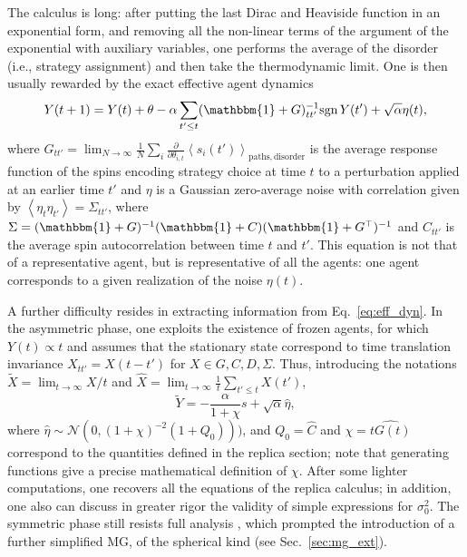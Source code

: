 \documentclass[aps,twocolumn,nofootinbib,sortedaddress,reprint]{revtex4-1}
\begin{document}
The calculus is long: after putting the last Dirac and Heaviside
function in an exponential form, and removing all the non-linear terms
of the argument of the exponential with auxiliary variables, one
performs the average of the disorder (i.e., strategy assignment) and
then take the thermodynamic limit. One is then usually rewarded by the
exact effective agent dynamics
\begin{equation}\label{eq:eff_dyn}
Y(t+1)=Y(t)+\theta-\alpha\sum_{t'\le
  t}(\mathbbm{1}+G)_{tt'}^{-1}\textrm{sgn}\,Y(t')+\sqrt{\alpha}\eta(t),
\end{equation}
where $G_{tt'}=\lim_{N\to\infty}\frac{1}{N}\sum_i\frac{\partial
}{\partial \theta_{i,t}}\left<s_i(t')\right>_\mathrm{paths, disorder}$
is the average response function of the spins encoding strategy choice
at time $t$ to a perturbation applied at an earlier time $t'$ and
$\eta$ is a Gaussian zero-average noise with correlation given by
$\left<\eta_t\eta_{t'}\right>=\Sigma_{tt'}$, where
$\Sigma=(\mathbbm{1}+G)^{-1}(\mathbbm{1}+C)(\mathbbm{1}+G^\top)^{-1}$ and
$C_{tt'}$ is the average spin autocorrelation between time $t$ and
$t'$.  This equation is not that of a representative agent, but is
representative of all the agents: one agent corresponds to a given
realization of the noise $\eta(t)$.

A further difficulty resides in extracting information from
Eq.\ \eqref{eq:eff_dyn}. In the asymmetric phase, one exploits the
existence of frozen agents, for which $Y(t)\propto t$ and assumes that
the stationary state correspond to time translation invariance
$X_{tt'}=X(t-t')$ for $X\in{G,C,D,\Sigma}$.  Thus, introducing the
notations $\tilde{X}=\lim_{t\to\infty}X/t$ and $\hat
X=\lim_{t\to\infty}\frac{1}{t}\sum_{t'\le t}X(t')$,
\begin{equation}
 \tilde Y=-\frac{\alpha}{1+\chi}s+\sqrt{\alpha}\hat{\eta},
\end{equation}
where $\hat{\eta}\sim\mathcal{N}(0,(1+\chi)^{-2}(1+Q_0)))$, and
$Q_0=\hat{ C}$ and $\chi=\hat{tG(t)}$ correspond to the quantities
defined in the replica section; note that generating functions give a
precise mathematical definition of $\chi$. After some
lighter computations, one recovers all the equations of the replica
calculus; in addition, one also can discuss in greater rigor the
validity of simple expressions for $\sigma^2_0$.  The symmetric phase
still resists full analysis \cite{demartino2011nonergodic}, which
prompted the introduction of a further simplified MG, of the spherical
kind \cite{galla2003dynamics} (see Sec.~\ref{sec:mg_ext}).
\end{document}
